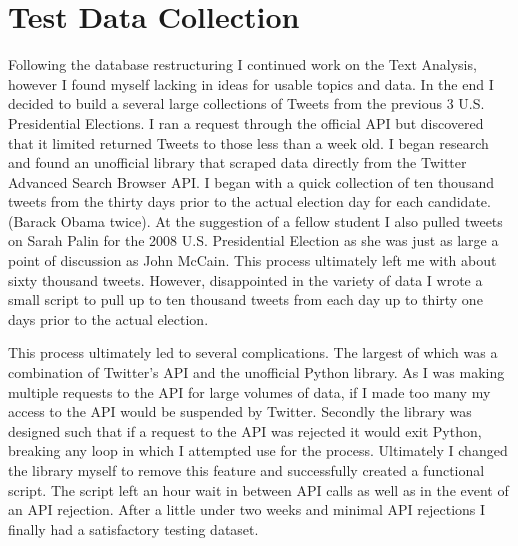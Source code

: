 \documentclass[12pt,a4paper]{report}
\begin{document}
  \section{Test Data Collection}
  Following the database restructuring I continued work on the Text Analysis, however I found myself lacking in ideas for usable topics and data. In the end I decided to build a several large collections of Tweets from the previous 3 U.S. Presidential Elections. I ran a request through the official API but discovered that it limited returned Tweets to those less than a week old. I began research and found an unofficial library that scraped data directly from the Twitter Advanced Search Browser API. I began with a quick collection of ten thousand tweets from the thirty days prior to the actual election day for each candidate. (Barack Obama twice). At the suggestion of a fellow student I also pulled tweets on Sarah Palin for the 2008 U.S. Presidential Election as she was just as large a point of discussion as John McCain. This process ultimately left me with about sixty thousand tweets. However, disappointed in the variety of data I wrote a small script to pull up to ten thousand tweets from each day up to thirty one days prior to the actual election. 
  \par
  This process ultimately led to several complications. The largest of which was a combination of Twitter’s API and the unofficial Python library. As I was making multiple requests to the API for large volumes of data, if I made too many my access to the API would be suspended by Twitter. Secondly the library was designed such that if a request to the API was rejected it would exit Python, breaking any loop in which I attempted use for the process. Ultimately I changed the library myself to remove this feature and successfully created a functional script. The script left an hour wait in between API calls as well as in the event of an API rejection. After a little under two weeks and minimal API rejections I finally had a satisfactory testing dataset.
  \clearpage
\end{document}
